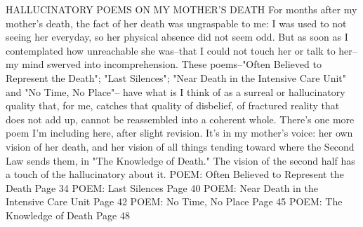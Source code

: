 HALLUCINATORY POEMS ON MY MOTHER'S DEATH
For months after my mother's death, the fact of her death was ungraspable to me: I was used to not seeing her everyday, so her physical absence did not seem odd. But as soon as I contemplated how unreachable she was--that I could not touch her or talk to her--my mind swerved into incomprehension. These poems--"Often Believed to Represent the Death"; "Last Silences"; "Near Death in the Intensive Care Unit" and "No Time, No Place"-- have what is I think of as a surreal or hallucinatory quality that, for me, catches that quality of disbelief, of fractured reality that does not add up, cannot be reassembled into a coherent whole. There's one more poem I'm including here, after slight revision. It's in my mother's voice: her own vision of her death, and her vision of all things tending toward where the Second Law sends them, in "The Knowledge of Death." The vision of the second half has a touch of the hallucinatory about it.
POEM: Often Believed to Represent the Death Page 34
POEM: Last Silences  Page 40
POEM: Near Death in the Intensive Care Unit Page 42
POEM: No Time, No Place Page 45
POEM:  The Knowledge of Death Page 48